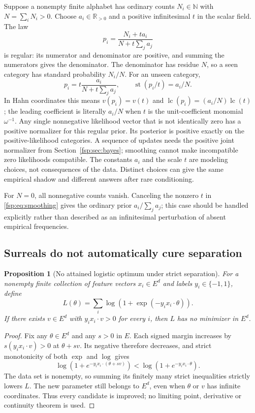 \documentclass[11pt,a4paper]{article}
\numberwithin{equation}{section}
\newtheorem{proposition}[theorem]{Proposition}
\theoremstyle{definition}
\theoremstyle{remark}
\newcommand{\R}{\mathbb R}
\newcommand{\N}{\mathbb N}
\newcommand{\st}{\operatorname{st}}
\newcommand{\lc}{\operatorname{lc}}
\begin{document}
Suppose a nonempty finite alphabet has ordinary counts $N_i\in\N$
with $N=\sum_iN_i>0$. Choose $a_i\in\R_{>0}$ and a positive
infinitesimal $t$ in the scalar field.
The law
\begin{equation}\label{fsp:eq:smoothing}
 p_i=\frac{N_i+t a_i}{N+t\sum_j a_j}
\end{equation}
is regular: its numerator and denominator are positive, and summing
the numerators gives the denominator. The denominator has residue $N$,
so a seen category has standard probability $N_i/N$. For an unseen
category,
\[
 p_i=t\frac{a_i}{N+t\sum_j a_j},\qquad
 \st(p_i/t)=a_i/N.
\]
In Hahn coordinates this means $v(p_i)=v(t)$ and
$\lc(p_i)=(a_i/N)\lc(t)$; the leading coefficient is literally $a_i/N$
when $t$ is the unit-coefficient monomial $\omega^{-1}$.
Any single nonnegative likelihood vector that is not identically zero
has a positive normalizer for this regular prior. Its posterior is
positive exactly on the positive-likelihood categories. A sequence of
updates needs the positive joint normalizer from
Section~\ref{fsp:sec:bayes}; smoothing cannot make incompatible zero
likelihoods compatible. The constants $a_i$ and the scale $t$ are
modeling choices, not consequences of the data. Distinct choices
can give the same empirical shadow and different answers after rare
conditioning.

For $N=0$, all nonnegative counts vanish. Canceling the nonzero $t$
in \eqref{fsp:eq:smoothing} gives the ordinary prior $a_i/\sum_j a_j$;
this case should be handled explicitly rather
than described as an infinitesimal perturbation of absent empirical
frequencies.

\subsection{Surreals do not automatically cure separation}

\begin{proposition}[No attained logistic optimum under strict separation]
\label{fsp:prop:separation}
For a nonempty finite collection of feature vectors $x_i\in E^d$ and labels
$y_i\in\{-1,1\}$, define
\begin{equation}
 L(\theta)=\sum_i\log(1+\exp(-y_i x_i\cdot\theta)).
\end{equation}
If there exists $v\in E^d$ with $y_i x_i\cdot v>0$ for every $i$,
then $L$ has no minimizer in $E^d$.
\end{proposition}
\begin{proof}
Fix any $\theta\in E^d$ and any $s>0$ in $E$. Each signed margin
increases by $s(y_i x_i\cdot v)>0$ at $\theta+sv$. Its negative
therefore decreases, and strict monotonicity of both $\exp$ and $\log$
gives
\[
 \log(1+e^{-y_i x_i\cdot(\theta+sv)})
 <\log(1+e^{-y_i x_i\cdot\theta}).
\]
The data set is nonempty, so summing its finitely many strict inequalities
strictly lowers $L$. The new parameter still belongs to $E^d$, even when
$\theta$ or $v$ has infinite coordinates. Thus every candidate is improved;
no limiting point, derivative or continuity theorem is used.
\end{proof}
\end{document}
